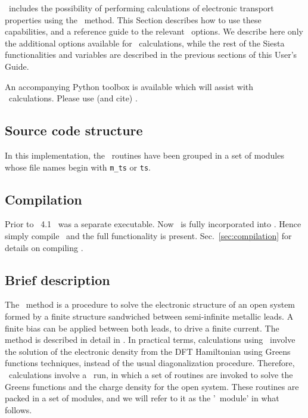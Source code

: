 \siesta\ includes the possibility of performing calculations of
electronic transport properties using the \tsiesta\ method. This
Section describes how to use these
capabilities, and a reference guide to the relevant \fdflib\
options. We describe here only the additional options available for
\tsiesta\ calculations, while the rest of the Siesta functionalities
and variables are described in the previous sections of this User's
Guide.

An accompanying Python toolbox is available which will assist with
\tsiesta\ calculations. Please use (and cite) \sisl\cite{sisl}.


\subsection{Source code structure}

In this implementation, the \tsiesta\ routines have been grouped in a
set of modules whose file names begin with \texttt{m\_ts} or
\texttt{ts}.

\subsection{Compilation}

Prior to \siesta\ 4.1 \tsiesta\ was a separate executable. Now
\tsiesta\ is fully incorporated into \siesta. Hence simply compile
\siesta\ and the full functionality is present.
Sec.~\ref{sec:compilation} for details on compiling \siesta.

\subsection{Brief description}

The \tsiesta\ method is a procedure to solve the electronic
structure of an open system formed by a finite structure sandwiched
between semi-infinite metallic leads. A finite bias can be applied
between both leads, to drive a finite current. The method is described
in detail in \cite{Brandbyge2002,Papior2017}. In practical terms,
calculations using \tsiesta\ involve the solution of the
electronic density from the DFT Hamiltonian using Greens functions
techniques, instead of the usual diagonalization procedure. Therefore,
\tsiesta\ calculations involve a \siesta\ run, in which a
set of routines are invoked to solve the Greens functions and the
charge density for the open system. These routines are packed in a set
of modules, and we will refer to it as the '\tsiesta\ module'
in what follows.

